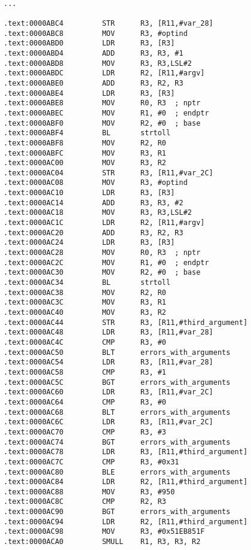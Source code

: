 \begin{lstlisting}[style=customasmARM]

...

.text:0000ABC4         STR      R3, [R11,#var_28]
.text:0000ABC8         MOV      R3, #optind
.text:0000ABD0         LDR      R3, [R3]
.text:0000ABD4         ADD      R3, R3, #1
.text:0000ABD8         MOV      R3, R3,LSL#2
.text:0000ABDC         LDR      R2, [R11,#argv]
.text:0000ABE0         ADD      R3, R2, R3
.text:0000ABE4         LDR      R3, [R3]
.text:0000ABE8         MOV      R0, R3  ; nptr
.text:0000ABEC         MOV      R1, #0  ; endptr
.text:0000ABF0         MOV      R2, #0  ; base
.text:0000ABF4         BL       strtoll
.text:0000ABF8         MOV      R2, R0
.text:0000ABFC         MOV      R3, R1
.text:0000AC00         MOV      R3, R2
.text:0000AC04         STR      R3, [R11,#var_2C]
.text:0000AC08         MOV      R3, #optind
.text:0000AC10         LDR      R3, [R3]
.text:0000AC14         ADD      R3, R3, #2
.text:0000AC18         MOV      R3, R3,LSL#2
.text:0000AC1C         LDR      R2, [R11,#argv]
.text:0000AC20         ADD      R3, R2, R3
.text:0000AC24         LDR      R3, [R3]
.text:0000AC28         MOV      R0, R3  ; nptr
.text:0000AC2C         MOV      R1, #0  ; endptr
.text:0000AC30         MOV      R2, #0  ; base
.text:0000AC34         BL       strtoll
.text:0000AC38         MOV      R2, R0
.text:0000AC3C         MOV      R3, R1
.text:0000AC40         MOV      R3, R2
.text:0000AC44         STR      R3, [R11,#third_argument]
.text:0000AC48         LDR      R3, [R11,#var_28]
.text:0000AC4C         CMP      R3, #0
.text:0000AC50         BLT      errors_with_arguments
.text:0000AC54         LDR      R3, [R11,#var_28]
.text:0000AC58         CMP      R3, #1
.text:0000AC5C         BGT      errors_with_arguments
.text:0000AC60         LDR      R3, [R11,#var_2C]
.text:0000AC64         CMP      R3, #0
.text:0000AC68         BLT      errors_with_arguments
.text:0000AC6C         LDR      R3, [R11,#var_2C]
.text:0000AC70         CMP      R3, #3
.text:0000AC74         BGT      errors_with_arguments
.text:0000AC78         LDR      R3, [R11,#third_argument]
.text:0000AC7C         CMP      R3, #0x31
.text:0000AC80         BLE      errors_with_arguments
.text:0000AC84         LDR      R2, [R11,#third_argument]
.text:0000AC88         MOV      R3, #950
.text:0000AC8C         CMP      R2, R3
.text:0000AC90         BGT      errors_with_arguments
.text:0000AC94         LDR      R2, [R11,#third_argument]
.text:0000AC98         MOV      R3, #0x51EB851F
.text:0000ACA0         SMULL    R1, R3, R3, R2

\end{lstlisting}

